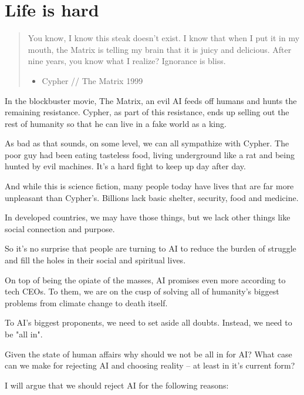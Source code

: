 \documentclass[11pt]{article}
\begin{document}
\section{Life is hard}
\label{sec:org80395c8}

\begin{quote}
You know, I know this steak doesn't exist. I know that when I put it in my mouth, the Matrix is telling my brain that it is juicy and delicious. After nine years, you know what I realize? Ignorance is bliss.
\begin{itemize}
\item Cypher // The Matrix 1999
\end{itemize}
\end{quote}

In the blockbuster movie, The Matrix, an evil AI feeds off humans and hunts the remaining resistance. Cypher, as part of this resistance, ends up selling out the rest of humanity so that he can live in a fake world as a king. 

As bad as that sounds, on some level, we can all sympathize with Cypher. The poor guy had been eating tasteless food, living underground like a rat and being hunted by evil machines. It's a hard fight to keep up day after day. 

And while this is science fiction, many people today have lives that are far more unpleasant than Cypher's. Billions lack basic shelter, security, food and medicine.

In developed countries, we may have those things, but we lack other things like social connection and purpose.

So it's no surprise that people are turning to AI to reduce the burden of struggle and fill the holes in their social and spiritual lives.

On top of being the opiate of the masses, AI promises even more according to tech CEOs. To them, we are on the cusp of solving all of humanity's biggest problems from climate change to death itself.

To AI's biggest proponents, we need to set aside all doubts. Instead, we need to be "all in".

Given the state of human affairs why should we not be all in for AI? What case can we make for rejecting AI and choosing reality -- at least in it's current form? 

I will argue that we should reject AI for the following reasons:
\end{document}
